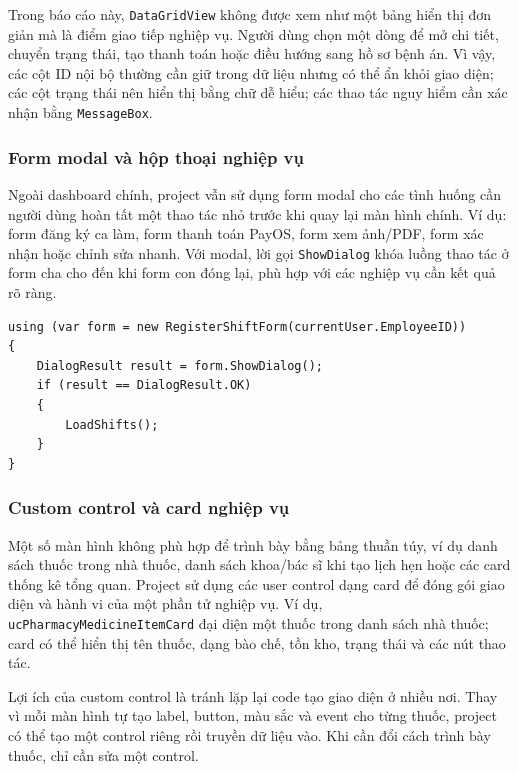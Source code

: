 \documentclass[12pt,a4paper]{article}
\numberwithin{figure}{subsection}
\numberwithin{table}{subsection}
\newcounter{codecounter}
\newenvironment{codeblock}[2]{%
    \refstepcounter{codecounter}%
    \phantomsection%
    \label{#1}%
    \par\smallskip
}{%
    \par\smallskip
}
\begin{document}
Trong báo cáo này, \texttt{DataGridView} không được xem như một bảng hiển thị đơn giản mà là điểm giao tiếp nghiệp vụ. Người dùng chọn một dòng để mở chi tiết, chuyển trạng thái, tạo thanh toán hoặc điều hướng sang hồ sơ bệnh án. Vì vậy, các cột ID nội bộ thường cần giữ trong dữ liệu nhưng có thể ẩn khỏi giao diện; các cột trạng thái nên hiển thị bằng chữ dễ hiểu; các thao tác nguy hiểm cần xác nhận bằng \texttt{MessageBox}.

\subsubsection{Form modal và hộp thoại nghiệp vụ}

Ngoài dashboard chính, project vẫn sử dụng form modal cho các tình huống cần người dùng hoàn tất một thao tác nhỏ trước khi quay lại màn hình chính. Ví dụ: form đăng ký ca làm, form thanh toán PayOS, form xem ảnh/PDF, form xác nhận hoặc chỉnh sửa nhanh. Với modal, lời gọi \texttt{ShowDialog} khóa luồng thao tác ở form cha cho đến khi form con đóng lại, phù hợp với các nghiệp vụ cần kết quả rõ ràng.

\begin{codeblock}{code:modal-dialog}{Mở form modal và nhận kết quả}
\begin{verbatim}
using (var form = new RegisterShiftForm(currentUser.EmployeeID))
{
    DialogResult result = form.ShowDialog();
    if (result == DialogResult.OK)
    {
        LoadShifts();
    }
}
\end{verbatim}
\end{codeblock}

\subsubsection{Custom control và card nghiệp vụ}

Một số màn hình không phù hợp để trình bày bằng bảng thuần túy, ví dụ danh sách thuốc trong nhà thuốc, danh sách khoa/bác sĩ khi tạo lịch hẹn hoặc các card thống kê tổng quan. Project sử dụng các user control dạng card để đóng gói giao diện và hành vi của một phần tử nghiệp vụ. Ví dụ, \texttt{ucPharmacyMedicineItemCard} đại diện một thuốc trong danh sách nhà thuốc; card có thể hiển thị tên thuốc, dạng bào chế, tồn kho, trạng thái và các nút thao tác.

Lợi ích của custom control là tránh lặp lại code tạo giao diện ở nhiều nơi. Thay vì mỗi màn hình tự tạo label, button, màu sắc và event cho từng thuốc, project có thể tạo một control riêng rồi truyền dữ liệu vào. Khi cần đổi cách trình bày thuốc, chỉ cần sửa một control.
\end{document}
